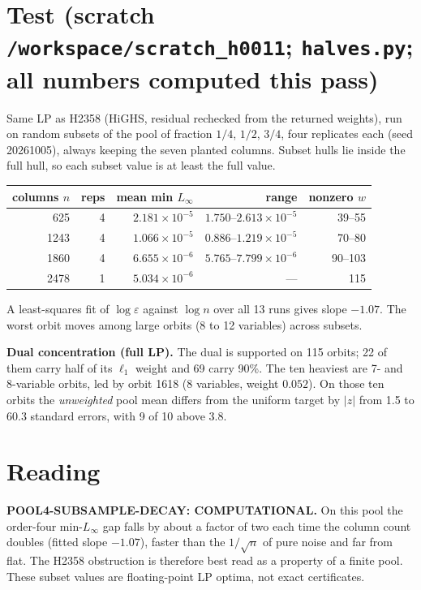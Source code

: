 \documentclass[11pt]{article}
\begin{document}
\section*{Test (scratch \texttt{/workspace/scratch\_h0011}; \texttt{halves.py}; all numbers computed this pass)}
Same LP as H2358 (HiGHS, residual rechecked from the returned weights), run on random subsets of the pool of fraction $1/4$, $1/2$, $3/4$, four replicates each (seed 20261005), always keeping the seven planted columns. Subset hulls lie inside the full hull, so each subset value is at least the full value.
\begin{center}\begin{tabular}{rrrrr}\toprule
columns $n$ & reps & mean min $L_\infty$ & range & nonzero $w$\\\midrule
625 & 4 & $2.181\times10^{-5}$ & $1.750$--$2.613\times10^{-5}$ & 39--55\\
1243 & 4 & $1.066\times10^{-5}$ & $0.886$--$1.219\times10^{-5}$ & 70--80\\
1860 & 4 & $6.655\times10^{-6}$ & $5.765$--$7.799\times10^{-6}$ & 90--103\\
2478 & 1 & $5.034\times10^{-6}$ & --- & 115\\\bottomrule
\end{tabular}\end{center}
A least-squares fit of $\log\varepsilon$ against $\log n$ over all 13 runs gives slope $-1.07$. The worst orbit moves among large orbits (8 to 12 variables) across subsets.

\textbf{Dual concentration (full LP).} The dual is supported on 115 orbits; 22 of them carry half of its $\ell_1$ weight and 69 carry 90\%. The ten heaviest are 7- and 8-variable orbits, led by orbit 1618 (8 variables, weight $0.052$). On those ten orbits the \emph{unweighted} pool mean differs from the uniform target by $|z|$ from 1.5 to 60.3 standard errors, with 9 of 10 above 3.8.

\section*{Reading}
\textbf{POOL4-SUBSAMPLE-DECAY: COMPUTATIONAL.} On this pool the order-four min-$L_\infty$ gap falls by about a factor of two each time the column count doubles (fitted slope $-1.07$), faster than the $1/\sqrt n$ of pure noise and far from flat. The H2358 obstruction is therefore best read as a property of a finite pool. These subset values are floating-point LP optima, not exact certificates.
\end{document}
